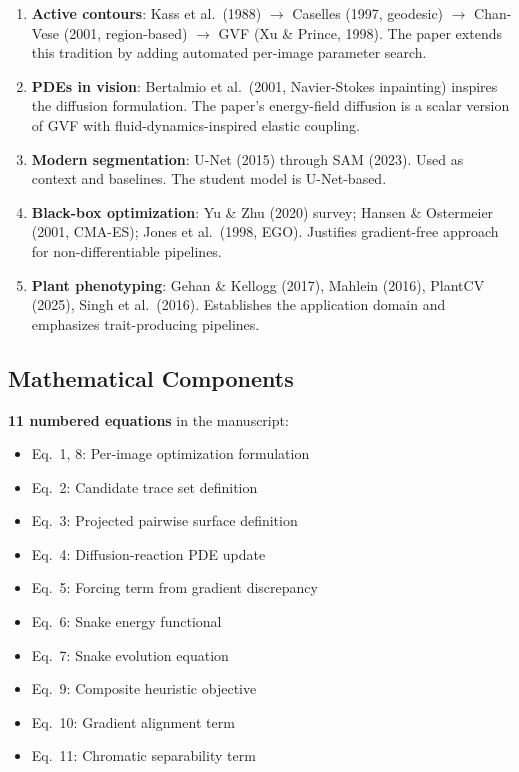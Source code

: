 \documentclass[11pt,a4paper]{article}
\begin{document}
\begin{enumerate}[nosep]
  \item \textbf{Active contours}: Kass et al.\ (1988) $\to$ Caselles (1997, geodesic) $\to$ Chan-Vese (2001, region-based) $\to$ GVF (Xu \& Prince, 1998).  The paper extends this tradition by adding automated per-image parameter search.

  \item \textbf{PDEs in vision}: Bertalmio et al.\ (2001, Navier-Stokes inpainting) inspires the diffusion formulation.  The paper's energy-field diffusion is a scalar version of GVF with fluid-dynamics-inspired elastic coupling.

  \item \textbf{Modern segmentation}: U-Net (2015) through SAM (2023).  Used as context and baselines.  The student model is U-Net-based.

  \item \textbf{Black-box optimization}: Yu \& Zhu (2020) survey; Hansen \& Ostermeier (2001, CMA-ES); Jones et al.\ (1998, EGO).  Justifies gradient-free approach for non-differentiable pipelines.

  \item \textbf{Plant phenotyping}: Gehan \& Kellogg (2017), Mahlein (2016), PlantCV (2025), Singh et al.\ (2016).  Establishes the application domain and emphasizes trait-producing pipelines.
\end{enumerate}

\subsection{Mathematical Components}

\textbf{11 numbered equations} in the manuscript:
\begin{itemize}[nosep]
  \item Eq.~1, 8: Per-image optimization formulation
  \item Eq.~2: Candidate trace set definition
  \item Eq.~3: Projected pairwise surface definition
  \item Eq.~4: Diffusion-reaction PDE update
  \item Eq.~5: Forcing term from gradient discrepancy
  \item Eq.~6: Snake energy functional
  \item Eq.~7: Snake evolution equation
  \item Eq.~9: Composite heuristic objective
  \item Eq.~10: Gradient alignment term
  \item Eq.~11: Chromatic separability term
\end{itemize}
\end{document}
